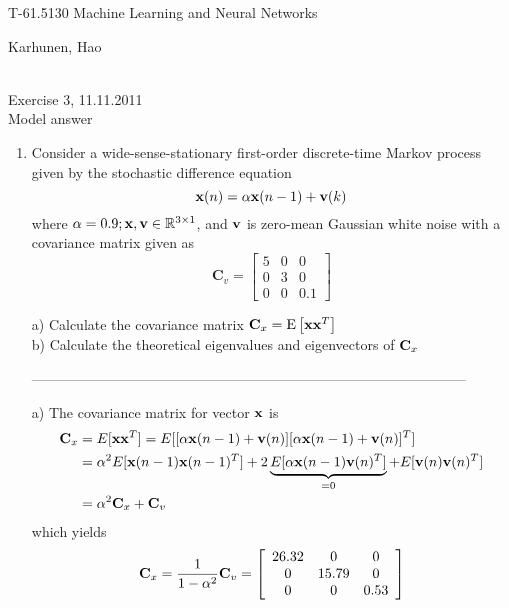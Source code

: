 \documentclass[10pt]{article}
\begin{document}
\pagestyle{empty}
\begin{Large}
\begin{bf} 
T-61.5130 Machine Learning and Neural Networks\\ 
\end{bf}
\end{Large}
Karhunen, Hao\\  
\\
\begin{large}
\begin{bf}
Exercise 3,  11.11.2011\\Model answer
\end{bf}
\end{large}
\begin{enumerate}

\item Consider a wide-sense-stationary
  first-order discrete-time Markov process given by the stochastic
  difference equation
\[
{\bf x}(n) = \alpha {\bf x}(n-1) + {\bf v}(k)
\]
where $\alpha = 0.9; {\bf x}, {\bf v} \in \mathbb{R}^{3\times 1}$,
and ${\bf v}$ is zero-mean Gaussian white noise with a covariance
matrix given as
\[ \textbf{C}_v = \left[ \begin{array}{ccc}
5 & 0 & 0 \\
0 & 3 & 0 \\
0 & 0 & 0.1 \end{array} \right]\]

a) Calculate the covariance matrix ${\bf C}_x = \text{E}\left[ {\bf
    xx}^T \right]$\\
b) Calculate the theoretical eigenvalues and eigenvectors of ${\bf C}_x$

---------------------------------------------------------------------------------------------

a) The covariance matrix for vector $\mathbf{x}$ is
\[
\begin{split}
\mathbf{C}_x &=
E[\mathbf{x} \mathbf{x}^T]=E[[\alpha\mathbf{x}(n-1)+\mathbf{v}(n)][\alpha\mathbf{x}(n-1)+\mathbf{v}(n)]^T]\\
&=\alpha^2 E[\mathbf{x}(n-1)\mathbf{x}(n-1)^T]+2 \underbrace{E[\alpha \mathbf{x}(n-1)\mathbf{v}(n)^T]}_{=0}+ E[\mathbf{v}(n)\mathbf{v}(n)^T]\\
&=\alpha^2 \mathbf{C}_x + \mathbf{C}_v
\end{split}
\]
which yields
\[
\mathbf{C}_x = \frac{1}{1-\alpha^2}\mathbf{C}_v=
\left[\begin{array}{ccc}
26.32 & 0     & 0 \\
0     & 15.79 & 0 \\
0     & 0     & 0.53 
\end{array}\right]
\]



\end{enumerate}
\end{document}
